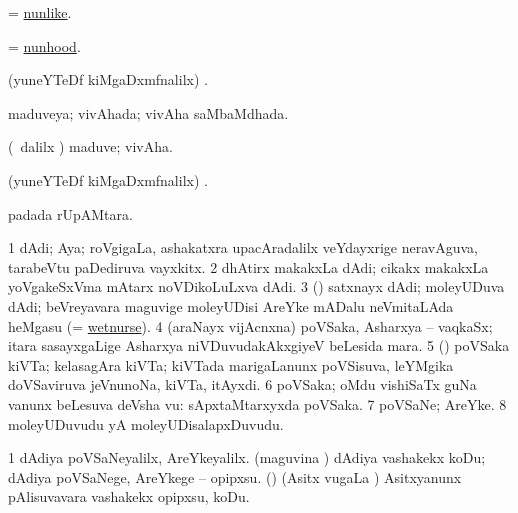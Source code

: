 \bentry
{}
\gl{\gu}
\bmng
= \hyperlink{nunlike}{nunlike}. 
\emng
\eentry


\bentry
{}
\gl{\nA}
\bmng
= \hyperlink{nunhood}{nunhood}. 
\emng
\eentry

\bentry
{}
\gl{\saMkiSx}
\bmng
(yuneYTeDf kiMgaDxmfnalilx) . 
\emng
\eentry

\bentry
{}
\gl{\gu}
\bmng
maduveya; vivAhada; vivAha saMbaMdhada. 
\emng
\eentry

\bentry
{}
\gl{\nA}
\bmng
(\sA\ \bava dalilx \parx) maduve; vivAha. 
\emng
\eentry

\bentry
{}
\gl{\saMkiSx}
\bmng
(yuneYTeDf kiMgaDxmfnalilx) . 
\emng
\eentry

\bentry
{}
\bmng
{} padada rUpAMtara. 
\emng
\eentry

\bentry
{}
\gl{\nA}
\bmng
\bnum
\num{1} dAdi; Aya; roVgigaLa, ashakatxra upacAradalilx veYdayxrige neravAguva, tarabeVtu paDediruva vayxkitx. 
\num{2} dhAtirx makakxLa dAdi; cikakx makakxLa yoVgakeSxVma mAtarx noVDikoLuLxva dAdi. 
\num{3} (\pArxparx) satxnayx dAdi; moleyUDuva dAdi; beVreyavara maguvige moleyUDisi AreYke mADalu neVmitaLAda heMgasu (= \hyperref{kandict_w.pdf}{W}{wet-nurse(1)}{wetnurse}). 
\num{4} (araNayx vijAcnxna) poVSaka, Asharxya -- vaqkaSx; itara sasayxgaLige Asharxya niVDuvudakAkxgiyeV beLesida mara. 
\num{5} (\pArxvi) poVSaka kiVTa; kelasagAra kiVTa; kiVTada marigaLanunx poVSisuva, leYMgika doVSaviruva jeVnunoNa, kiVTa, itAyxdi. 
\num{6} poVSaka; oMdu vishiSaTx guNa \mo vanunx beLesuva deVsha \mo vu:  sApxtaMtarxyxda poVSaka. 
\num{7} poVSaNe; AreYke. 
\num{8} moleyUDuvudu yA moleyUDisalapxDuvudu. 
\enum
\emng

\noindent
\gl{\pagu}
\bmng
\bnum
\num{1}  dAdiya poVSaNeyalilx, AreYkeyalilx. 
  
\banum
{} (maguvina \vi) dAdiya vashakekx koDu; dAdiya poVSaNege, AreYkege -- opipxsu. 
 (\rUpa) (Asitx \mo vugaLa \vi) Asitxyanunx pAlisuvavara vashakekx opipxsu, koDu. 
\eanum
\numie
\enum
\emng
\eentry

